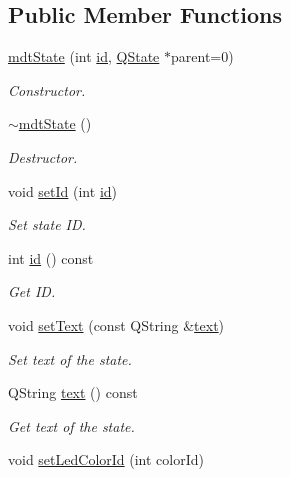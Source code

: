 \subsection*{Public Member Functions}
\begin{DoxyCompactItemize}
\item 
\hyperlink{classmdt_state_a8a6c3059b9ace83fc20feb0fcc7159df}{mdt\-State} (int \hyperlink{classmdt_state_a034345dce9f3d0c976d5987bd42dc1cf}{id}, \hyperlink{class_q_state}{Q\-State} $\ast$parent=0)
\begin{DoxyCompactList}\small\item\em Constructor. \end{DoxyCompactList}\item 
\hyperlink{classmdt_state_a64560fbb87511491a0247d0c0ec9613a}{$\sim$mdt\-State} ()
\begin{DoxyCompactList}\small\item\em Destructor. \end{DoxyCompactList}\item 
void \hyperlink{classmdt_state_aece398b67e5bd5a6d1bcc83f109a1dff}{set\-Id} (int \hyperlink{classmdt_state_a034345dce9f3d0c976d5987bd42dc1cf}{id})
\begin{DoxyCompactList}\small\item\em Set state I\-D. \end{DoxyCompactList}\item 
int \hyperlink{classmdt_state_a034345dce9f3d0c976d5987bd42dc1cf}{id} () const 
\begin{DoxyCompactList}\small\item\em Get I\-D. \end{DoxyCompactList}\item 
void \hyperlink{classmdt_state_a29e0ba7724b674ee25954a89c66544e2}{set\-Text} (const Q\-String \&\hyperlink{classmdt_state_ab6dabbc771acb33f16c3caf169414d53}{text})
\begin{DoxyCompactList}\small\item\em Set text of the state. \end{DoxyCompactList}\item 
Q\-String \hyperlink{classmdt_state_ab6dabbc771acb33f16c3caf169414d53}{text} () const 
\begin{DoxyCompactList}\small\item\em Get text of the state. \end{DoxyCompactList}\item 
void \hyperlink{classmdt_state_a0a8a66a96a1e37cefc4367e3a5d71d8b}{set\-Led\-Color\-Id} (int color\-Id)

\end{DoxyCompactItemize}
